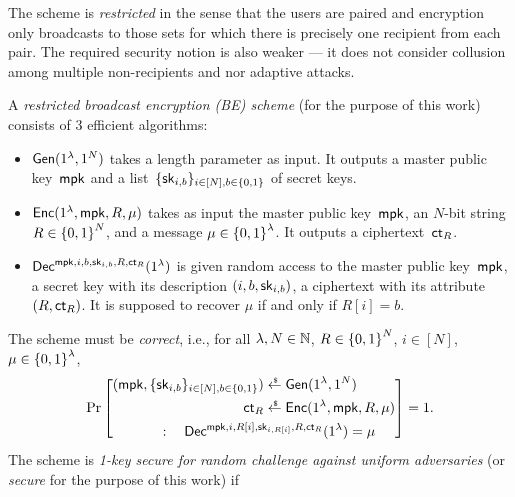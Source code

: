 The scheme is \emph{restricted} in the sense that the users are paired and encryption only broadcasts to those sets for which there is precisely one recipient from each pair.
The required security notion is also weaker --- it does not consider collusion among multiple non-recipients and nor adaptive attacks.

\begin{definition}
A \emph{restricted broadcast encryption (BE) scheme} (for the purpose of this work) consists of 3 efficient algorithms:
\begin{itemize}
\item $\Gen(1^\lambda,1^N)$ takes a length parameter as input.
It outputs a master public key~$\mpk$ and
a list~$\{\sk_{i,b}\}_{i\in[N],b\in\bit}$ of secret keys.
\item $\Enc(1^\lambda,\mpk,R,\mu)$ takes as input
the master public key~$\mpk$,
an $N$-bit string ${R\in{\{0,1\}}^N}$, and
a message ${\mu\in{\{0,1\}}^\lambda}$.
It outputs a ciphertext~$\ct_R$.
\item $\Dec^{\mpk,i,b,\sk_{i,b},R,\ct_R}(1^\lambda)$
is given random access to
the master public key~$\mpk$,
a secret key with its description $(i,b,\sk_{i,b})$,
a ciphertext with its attribute $(R,\ct_R)$.
It is supposed to recover $\mu$ if and only if ${R[i]=b}$.
\end{itemize}
The scheme must be \emph{correct}, i.e., for all
${\lambda,N\in{\mathbb{N}}}$,
${R\in{\{0,1\}}^N}$,
${i\in[N]}$,
${\mu\in{\{0,1\}}^\lambda}$,
\begin{align*}
\Pr\left[\begin{aligned}
(\mpk,\{\sk_{i,b}\}_{i\in[N],b\in\bit})
&{}
\draws\Gen(1^\lambda,1^N)
\\
\ct_R
&{}
\draws\Enc(1^\lambda,\mpk,R,\mu)
\\
:\quad
\Dec^{\mpk,i,R[i],\sk_{i,R[i]},R,\ct_R}
(1^\lambda)=\mu
\hspace*{-8em}
&
\end{aligned}
\right]
=1.
\end{align*}
The scheme is \emph{1-key secure for random challenge against uniform adversaries} (or \emph{secure} for the purpose of this work) if
\begin{align*}

\end{align*}
\end{definition}
